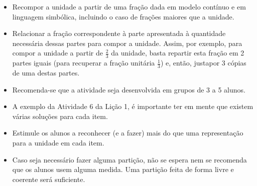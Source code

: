 \begin{multicols}{2}
\begin{solucao}{}{}
\end{solucao}

\newpage


\begin{objetivos}{}{}
  \begin{itemize} %
    \item       Recompor a unidade a partir de uma fração dada em modelo contínuo e em linguagem simbólica, incluindo o caso de frações maiores que a unidade.
    \item       Relacionar a fração correspondente à parte apresentada à quantidade necessária dessas partes para compor a unidade. Assim, por exemplo, para compor a unidade a partir de       $\frac{2}{3}$ da unidade, basta repartir esta fração em 2 partes iguais (para recuperar a fração unitária       $\frac{1}{3}$) e, então, justapor 3 cópias de uma destas partes.
\end{itemize} %
\end{objetivos}

\begin{orientacoes}
  \begin{itemize} %
    \item       Recomenda-se que a atividade seja desenvolvida em grupos de 3 a 5 alunos.
    \item       A exemplo da Atividade 6 da Lição 1, é importante ter em mente que existem várias soluções para cada item.
    \item       Estimule os alunos a reconhecer (e a fazer) mais do que uma representação para a unidade em cada item.
    \item       Caso seja necessário fazer alguma partição, não se espera nem se recomenda que os alunos usem alguma medida. Uma partição feita de forma livre e coerente será suficiente.
\end{itemize} %


  \vspace*{\fill}
\end{orientacoes}
\columnbreak


\end{multicols}
